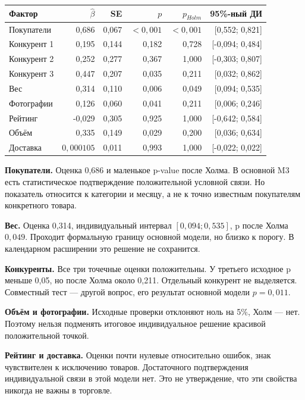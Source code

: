 \documentclass[12pt,a4paper]{article}
\begin{document}
\begin{center}\small
\begin{tabular}{lrrrrr}
\toprule
Фактор & $\widehat\beta$ & SE & $p$ & $p_{Holm}$ & 95\%-ный ДИ \\
\midrule
Покупатели & 0,686 & 0,067 & $<0{,}001$ & $<0{,}001$ & [0,552; 0,821] \\
Конкурент 1 & 0,195 & 0,144 & 0,182 & 0,728 & [-0,094; 0,484] \\
Конкурент 2 & 0,252 & 0,277 & 0,367 & 1,000 & [-0,303; 0,807] \\
Конкурент 3 & 0,447 & 0,207 & 0,035 & 0,211 & [0,032; 0,862] \\
Вес & 0,314 & 0,110 & 0,006 & 0,049 & [0,094; 0,535] \\
Фотографии & 0,126 & 0,060 & 0,041 & 0,211 & [0,006; 0,246] \\
Рейтинг & -0,029 & 0,305 & 0,925 & 1,000 & [-0,642; 0,584] \\
Объём & 0,335 & 0,149 & 0,029 & 0,200 & [0,036; 0,634] \\
Доставка & $0{,}000105$ & 0,011 & 0,993 & 1,000 & [-0,022; 0,022] \\
\bottomrule
\end{tabular}
\end{center}

\textbf{Покупатели.} Оценка 0,686 и маленькое p-value после Холма. В основной M3 есть статистическое подтверждение положительной условной связи. Но показатель относится к категории и месяцу, а не к точно известным покупателям конкретного товара.

\textbf{Вес.} Оценка 0,314, индивидуальный интервал $[0{,}094;0{,}535]$, p после Холма $0{,}049$. Проходит формальную границу основной модели, но близко к порогу. В календарном расширении это решение не сохранится.

\textbf{Конкуренты.} Все три точечные оценки положительны. У третьего исходное p меньше 0,05, но после Холма около 0,211. Отдельный конкурент не выделяется. Совместный тест --- другой вопрос, его результат основной модели $p=0{,}011$.

\textbf{Объём и фотографии.} Исходные проверки отклоняют ноль на 5\%, Холм --- нет. Поэтому нельзя подменять итоговое индивидуальное решение красивой положительной точкой.

\textbf{Рейтинг и доставка.} Оценки почти нулевые относительно ошибок, знак чувствителен к исключению товаров. Достаточного подтверждения индивидуальной связи в этой модели нет. Это не утверждение, что эти свойства никогда не важны в торговле.
\end{document}
